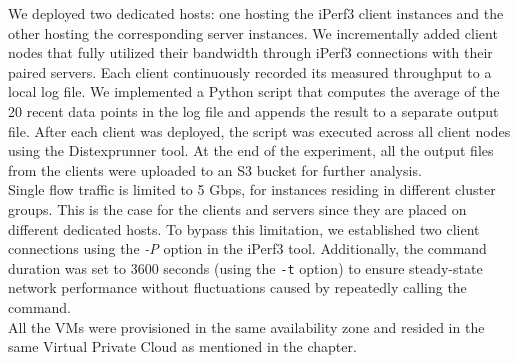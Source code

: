 \noindent
We deployed two dedicated hosts: one hosting the iPerf3 client instances and the other hosting the
corresponding server instances.
We incrementally added client nodes that fully utilized their bandwidth 
through iPerf3 connections with their paired servers. Each client continuously recorded its measured 
throughput to a local log file. We implemented a Python script that computes the average of the 20 
recent data points in the log file and appends the result to a separate output file. 
After each client was deployed, the script was executed across all client nodes using the Distexprunner 
tool. At the end of the experiment, all the output files from the clients were uploaded to an S3 bucket 
for further analysis. \\
Single flow traffic is limited to 5 Gbps, for instances residing in different cluster groups. This is 
the case for the clients and servers since they are placed on different dedicated hosts.   
To bypass this limitation, we established two client connections using the \textit{-P} 
option in the iPerf3 tool. Additionally, the command duration was set  
to 3600 seconds (using the \texttt{-t} option) to ensure steady-state network performance 
without fluctuations caused by repeatedly calling the command. \\
All the VMs were provisioned in the same availability zone and resided
in the same Virtual Private Cloud as mentioned in the  chapter. 
